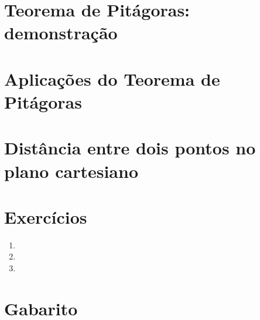 \documentclass[11pt,a4paper]{article}
\begin{document}
\section{Teorema de Pitágoras: demonstração}

\section{Aplicações do Teorema de Pitágoras}

\section{Distância entre dois pontos no plano cartesiano}


\section{Exercícios}
\begin{enumerate}[label=\textbf{\arabic*.}]
  \item %
  \item %
  \item %
\end{enumerate}

\begin{desafio}
\end{desafio}

\section*{Gabarito}
\end{document}
